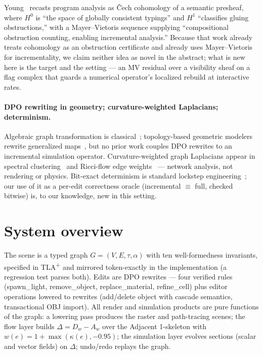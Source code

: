 Young~\cite{young2026sheaf} recasts program analysis as \v{C}ech cohomology
of a semantic presheaf, where $H^0$ is ``the space of globally consistent
typings'' and $H^1$ ``classifies gluing obstructions,'' with a
Mayer--Vietoris sequence supplying ``compositional obstruction counting,
enabling incremental analysis.'' Because that work already treats cohomology
as an obstruction certificate and already uses Mayer--Vietoris for
incrementality, we claim neither idea as novel in the abstract; what is new
here is the target and the setting --- an MV residual over a visibility
sheaf on a flag complex that guards a numerical operator's localized rebuild
at interactive rates.

\paragraph*{DPO rewriting in geometry; curvature-weighted Laplacians;
determinism.}
Algebraic graph transformation is classical~\cite{ehrig2006fundamentals};
topology-based geometric modelers rewrite generalized
maps~\cite{belhaouari2014jerboa}, but no prior work couples DPO rewrites to
an incremental simulation operator. Curvature-weighted graph Laplacians
appear in spectral clustering~\cite{kotharkar2026lly} and Ricci-flow edge
weights~\cite{ni2019community} --- network analysis, not rendering or
physics. Bit-exact determinism is standard lockstep
engineering~\cite{fiedler2010floating,demmel2013fast,ahrens2020algorithms}; our use of it
as a per-edit correctness oracle (incremental $\equiv$ full, checked
bitwise) is, to our knowledge, new in this setting.

\section{System overview}\label{sec:system}

The scene is a typed graph $G=(V,E,\tau,\alpha)$ with ten well-formedness
invariants, specified in TLA\textsuperscript{+} and mirrored token-exactly in
the implementation (a regression test parses both). Edits are DPO rewrites
--- four verified rules (\textsf{spawn\_light}, \textsf{remove\_object},
\textsf{replace\_material}, \textsf{refine\_cell}) plus editor operations
lowered to rewrites (add/delete object with cascade semantics, transactional
OBJ import). All render and simulation products are pure functions of the
graph: a lowering pass produces the raster and path-tracing scenes; the flow
layer builds $\Delta = D_w - A_w$ over the \textsf{Adjacent} 1-skeleton with
$w(e) = 1 + \max(\kappa(e), -0.95)$; the simulation layer evolves sections
(scalar and vector fields) on $\Delta$; undo/redo replays the graph.

